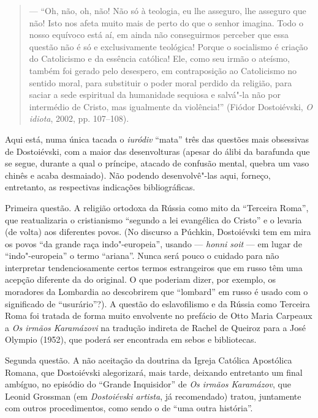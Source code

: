 \begin{quote}
--- ``Oh, não, oh, não! Não só à teologia, eu lhe asseguro, lhe
asseguro que não! Isto nos afeta muito mais de perto do que o senhor
imagina. Todo o nosso equívoco está aí, em ainda não conseguirmos
perceber que essa questão não é só e exclusivamente teológica! Porque o
socialismo é criação do Catolicismo e da essência católica! Ele, como
seu irmão o ateísmo, também foi gerado pelo desespero, em contraposição
ao Catolicismo no sentido moral, para substituir o poder moral perdido
da religião, para saciar a sede espiritual da humanidade sequiosa e
salvá"-la não por intermédio de Cristo, mas igualmente da violência!'' (Fiódor Dostoiévski, \emph{O idiota}, 2002, pp. 107--108).
\end{quote}

Aqui está, numa única tacada o \emph{iuródiv} ``mata'' três das questões
mais obsessivas de Dostoiévski, com a maior das desenvolturas (apesar
do álibi da barafunda que se segue, durante a qual o príncipe, atacado
de confusão mental, quebra um vaso chinês e acaba desmaiado). Não
podendo desenvolvê"-las aqui, forneço, entretanto, as respectivas indicações
bibliográficas.

Primeira questão. A religião ortodoxa da Rússia como mito da ``Terceira Roma'', que
reatualizaria o cristianismo ``segundo a lei evangélica do Cristo'' e o
levaria (de volta) aos diferentes povos. (No discurso a Púchkin,
Dostoiévski tem em mira os povos ``da grande raça indo"-europeia'',
usando --- \emph{honni soit} --- em lugar de ``indo"-europeia'' o termo ``ariana''. Nunca será pouco o cuidado para não interpretar
tendenciosamente certos termos estrangeiros que em russo têm uma acepção
diferente da do original. O que poderiam dizer, por exemplo, os
moradores da Lombardia ao descobrirem que ``lombard'' em russo é usado
com o significado de ``usurário''?). A questão do eslavofilismo e da
Rússia como Terceira Roma foi tratada de forma muito envolvente no
prefácio de Otto Maria Carpeaux a \emph{Os irmãos Karamázovi} na
tradução indireta de Rachel de Queiroz para a José Olympio (1952), que
poderá ser encontrada em sebos e bibliotecas.

Segunda questão. A não aceitação da doutrina da Igreja Católica Apostólica Romana, que
Dostoiévski alegorizará, mais tarde, deixando entretanto um final
ambíguo, no episódio do ``Grande Inquisidor'' de \emph{Os irmãos
Karamázov}, que Leonid Grossman (em \emph{Dostoiévski artista}, já recomendado) tratou, juntamente com outros
procedimentos, como sendo o de ``uma outra história''.

